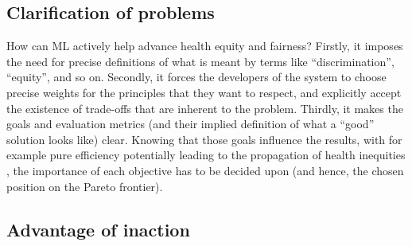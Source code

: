 \subsection{Clarification of problems}
How can ML actively help advance health equity and fairness?
Firstly, it imposes the need for precise definitions of what is meant by terms like ``discrimination'', ``equity'', and so on.
Secondly, it forces the developers of the system to choose precise weights for the principles that they want to respect, and explicitly accept the existence of trade-offs that are inherent to the problem.
Thirdly, it makes the goals and evaluation metrics (and their implied definition of what a ``good'' solution looks like) clear.
Knowing that those goals influence the results, with for example pure efficiency potentially leading to the propagation of health inequities \cite[p.~2]{Rajkomar2018}, the importance of each objective has to be decided upon (and hence, the chosen position on the Pareto frontier).



\subsection{Advantage of inaction}
